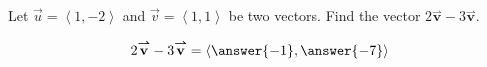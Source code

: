 \documentclass{ximera}
\author{Gregory Hartman \and Matthew Carr}
\begin{document}
\begin{exercise}
  
Let $\vec{u}=\left\langle 1,-2 \right\rangle$ and
$\vec{v}=\left\langle 1,1 \right\rangle$ be two vectors. Find the
vector $2 \overset{\boldsymbol{\rightharpoonup}}{\mathbf{v}}-3 \overset{\boldsymbol{\rightharpoonup}}{\mathbf{v}}$.
\begin{prompt}
\[
2 \overset{\boldsymbol{\rightharpoonup}}{\mathbf{v}}-3 \overset{\boldsymbol{\rightharpoonup}}{\mathbf{v}}=\left\langle \answer{-1},\answer{-7} \right\rangle
\]
\end{prompt}

\end{exercise}
\end{document}
